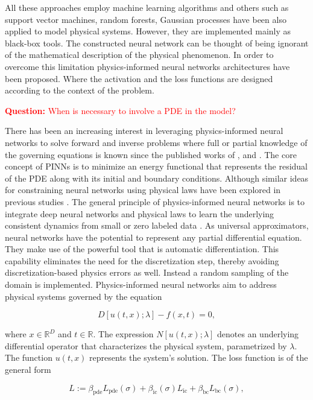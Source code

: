 \documentclass[11pt,twoside]{article}
\begin{document}
All these approaches employ machine learning algorithms and others such as support vector machines, 
random forests, Gaussian processes have been also applied to model physical systems. However, they 
are implemented mainly as black-box tools. The constructed neural network can be thought of being 
ignorant of the mathematical description of the physical phenomenon. In order to overcome this 
limitation physics-informed neural networks architectures have been proposed. Where the activation 
and the loss functions are designed according to the context of the problem.

\textcolor{red}{\textbf{Question:} When is necessary to involve a PDE in the model?}

There has been an increasing interest in leveraging physics-informed neural networks to solve forward and 
inverse problems where full or partial knowledge of the governing equations is known since the published 
works of ,  and 
. The core concept of PINNs is to minimize an energy functional that represents 
the residual of the PDE along with its initial and boundary conditions. Although similar ideas for constraining 
neural networks using physical laws have been explored in previous studies \citep{lagaris_artificial_1998}. 
The general principle of physics-informed neural networks is to integrate deep neural networks and physical 
laws to learn the underlying consistent dynamics from small or zero labeled data \citep{karniadakis_physics-informed_2021}. 
As universal approximators, neural networks have the potential to represent any partial differential 
equation. They make use of the powerful tool that is automatic differentiation. This capability eliminates 
the need for the discretization step, thereby avoiding discretization-based physics errors as well. 
Instead a random sampling of the domain is implemented. Physics-informed neural networks aim to address 
physical systems governed by the equation

$$
D[u(t, x); \lambda] - f(x,t) = 0,
$$

where \(x \in \mathbb{R}^D\) and \(t \in \mathbb{R}\). The expression \(N[u(t, x); \lambda]\) denotes 
an underlying differential operator that characterizes the physical system, parametrized by \(\lambda\). 
The function \(u(t, x)\) represents the system's solution. The loss function is of the general form 

$$ L := \beta_{\text{pde}}L_{\text{pde}}(\sigma) + \beta_{\text{ic}}(\sigma) L_{\text{ic}} + 
\beta_{\text{bc}} L_{\text{bc}}(\sigma) ,$$
\end{document}
